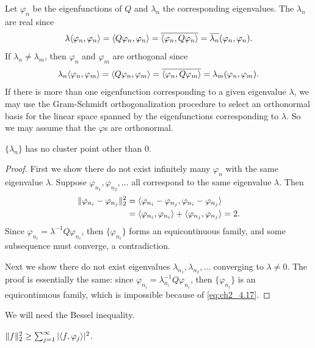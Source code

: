 Let $\varphi_n$ be the eigenfunctions of $Q$ and $\lambda_n$ the corresponding eigenvalues. The $\lambda_n$ are real since
\[
    \lambda\langle \varphi_n,\varphi_n \rangle = \langle Q\varphi_n,\varphi_n \rangle = \overline{\langle \varphi_n,Q\varphi_n \rangle} = \overline{\lambda_n}(\varphi_n,\varphi_n).
\]
If $\lambda_n \neq \lambda_m$, then $\varphi_n$ and $\varphi_m$ are orthogonal since
\[
    \lambda_n\langle \varphi_n,\varphi_m \rangle = \langle Q\varphi_n,\varphi_m \rangle = \overline{\langle \varphi_n,Q\varphi_m \rangle} = \lambda_m(\varphi_n,\varphi_m).
\]
If there is more than one eigenfunction corresponding to a given eigenvalue $\lambda$, we may use the Gram-Schmidt orthogonalization procedure to select an orthonormal basis for the linear space spanned by the eigenfunctions corresponding to $\lambda$. So we may assume that the $\varphi$s are orthonormal.

\begin{proposition}\label{prop:ch2_4.10}
$\{\lambda_n\}$ has no cluster point other than $0$.
\end{proposition}

\begin{proof}
First we show there do not exist infinitely many $\varphi_n$ with the same eigenvalue $\lambda$. Suppose $\varphi_{n_1},\varphi_{n_2},\ldots$ all correspond to the same eigenvalue
$\lambda$. Then
\begin{align}\label{eq:ch2_4.17}
    \|\varphi_{n_i} - \varphi_{n_j}\|_2^2 &= \langle \varphi_{n_i} - \varphi_{n_j}, \varphi_{n_i} - \varphi_{n_j} \rangle \\
    &= \langle \varphi_{n_i}, \varphi_{n_i} \rangle + \langle \varphi_{n_j}, \varphi_{n_j} \rangle = 2. \notag
\end{align}
Since $\varphi_{n_i} = \lambda^{-1}Q\varphi_{n_i}$, then $\{\varphi_{n_i}\}$ forms an equicontinuous family, and some subsequence must converge, a contradiction.

Next we show there do not exist eigenvalues $\lambda_{n_1},\lambda_{n_2},\ldots$ converging to $\lambda \neq 0$. The proof is essentially the same: since $\varphi_{n_i} = \lambda_{n_i}^{-1}Q\varphi_{n_i}$, then $\{\varphi_{n_i}\}$ is an equicontinuous family, which is impossible because of \eqref{eq:ch2_4.17}.
\end{proof}

We will need the Bessel inequality.

\begin{proposition}\label{prop:ch2_4.11}
$\|f\|_2^2 \geq \sum_{j=1}^{\infty} |\langle f, \varphi_j \rangle|^2$.
\end{proposition}

